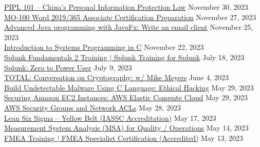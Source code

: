 \documentclass[10pt]{res} %
\begin{document}
\begin{resume}
\href{https://www.udemy.com/certificate/UC-fb504a2e-e10b-456e-9bc9-4bd81cf145fa}{\color{blue}PIPL 101 -- China's Personal Information Protection Law} \hfill November 30, 2023 \\
\href{https://www.udemy.com/certificate/UC-a729fcdf-2b20-478a-aec4-0b57f0335b44}{\color{blue}MO-100 Word 2019/365 Associate Certification Preparation} \hfill November 27, 2023 \\
\href{https://www.udemy.com/certificate/UC-ed9bcbd9-3395-4eb0-9f14-9dbd3ad217d0}{\color{blue}Advanced Java programming with JavaFx: Write an email client} \hfill November 25, 2023 \\
\href{https://www.udemy.com/certificate/UC-0e3e683a-81d3-4d96-b65c-f936fdcc20e3}{\color{blue}Introduction to Systems Programming in C} \hfill November 22, 2023 \\
\href{https://www.udemy.com/certificate/UC-5acb979f-fca5-4936-91b3-c8acb44e5e6b}{\color{blue}Splunk Fundamentals 2 Training $|$ Splunk Training for Splunk} \hfill July 18, 2023 \\
\href{https://www.udemy.com/certificate/UC-72bf224f-0709-4ee6-bdd9-aaba30d54ed4}{\color{blue}Splunk: Zero to Power User} \hfill July 9, 2023 \\
\href{https://www.udemy.com/certificate/UC-9f07c563-2f44-44fb-9f0a-67acba8be8ee}{\color{blue}TOTAL: Conversation on Cryptography: w/ Mike Meyers} \hfill June 4, 2023 \\
\href{https://www.udemy.com/certificate/UC-06d5ed98-42ff-4b53-8929-9cdeb0ea7533}{\color{blue}Build Undetectable Malware Using C Language: Ethical Hacking} \hfill May 29, 2023 \\
\href{https://www.udemy.com/certificate/UC-171ea119-d597-4287-b33f-6a93459c4c83}{\color{blue}Securing Amazon EC2 Instances: AWS Elastic Compute Cloud} \hfill May 29, 2023 \\
\href{https://www.udemy.com/certificate/UC-0cfc7ba5-eba8-462a-8c10-abe2969ea31a}{\color{blue}AWS Security Groups and Network ACLs} \hfill May 28, 2023 \\
\href{https://www.udemy.com/certificate/UC-925d8dbb-9fa4-448e-8b59-25fe0252b7d5}{\color{blue}Lean Six Sigma -- Yellow Belt (IASSC Accreditation)} \hfill May 17, 2023 \\
\href{https://www.udemy.com/certificate/UC-3514ddcf-0747-4d9b-a244-118e30e80957}{\color{blue}Measurement System Analysis (MSA) for Quality / Operations} \hfill May 14, 2023 \\
\href{https://www.udemy.com/certificate/UC-1e5f6fbd-5335-433f-ab43-ad35a14fde46}{\color{blue}FMEA Training $|$ FMEA Specialist Certification (Accredited)} \hfill May 13, 2023 \\

\end{resume}
\end{document}
